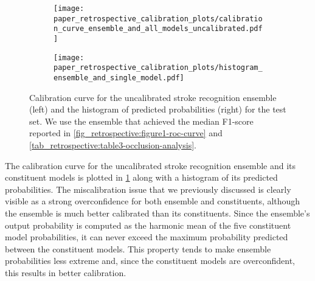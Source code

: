 \begin{figure}[t!]
    \centering
    \begin{subfigure}[c]{0.49\columnwidth}
        \centering
        \texttt{[image: paper\_retrospective\_calibration\_plots/calibration\_curve\_ensemble\_and\_all\_models\_uncalibrated.pdf]}
    \end{subfigure}
    \hfill
    \begin{subfigure}[c]{0.49\columnwidth}
        \centering
        \texttt{[image: paper\_retrospective\_calibration\_plots/histogram\_ensemble\_and\_single\_model.pdf]}
    \end{subfigure}
    \caption[Calibration curve for the uncalibrated stroke recognition ensemble and empirical distribution of predicted probabilities.]{ Calibration curve for the uncalibrated stroke recognition ensemble (left) and the histogram of predicted probabilities (right) for the test set. We use the ensemble that achieved the median F1-score reported in \cref{fig_retrospective:figure1-roc-curve} and \cref{tab_retrospective:table3-occlusion-analysis}.}
    \label{fig_discussion:retrospective-paper-calibration-curve-of-uncalibrated-model}
\end{figure}

The calibration curve for the uncalibrated stroke recognition ensemble and its constituent models is plotted in \cref{fig_discussion:retrospective-paper-calibration-curve-of-uncalibrated-model} along with a histogram of its predicted probabilities. The miscalibration issue that we previously discussed is clearly visible as a strong overconfidence for both ensemble and constituents, although the ensemble is much better calibrated than its constituents. Since the ensemble's output probability is computed as the harmonic mean of the five constituent model probabilities, it can never exceed the maximum probability predicted between the constituent models. This property tends to make ensemble probabilities less extreme and, since the constituent models are overconfident, this results in better calibration. 

